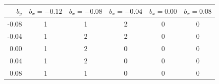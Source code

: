 \begin{tabular}{rccccc}
\toprule
$b_y$ & $b_x=-0.12$ & $b_x=-0.08$ & $b_x=-0.04$ & $b_x=0.00$ & $b_x=0.08$ \\
\midrule
-0.08 & 1 & 1 & 2 & 0 & 0 \\
-0.04 & 1 & 2 & 2 & 0 & 0 \\
0.00 & 1 & 2 & 0 & 0 & 0 \\
0.04 & 1 & 2 & 0 & 0 & 0 \\
0.08 & 1 & 1 & 0 & 0 & 0 \\
\bottomrule
\end{tabular}